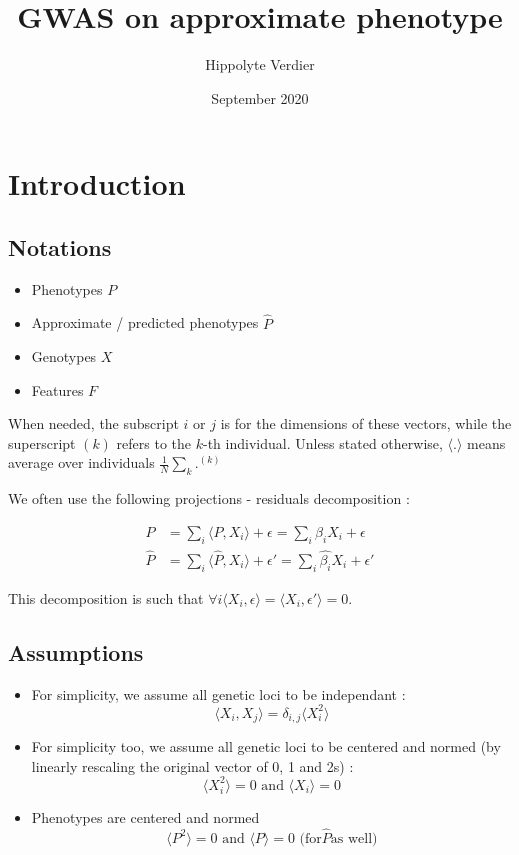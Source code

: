 \documentclass{article}
\title{GWAS on approximate phenotype}
\author{Hippolyte Verdier}
\date{September 2020}
\begin{document}
\maketitle

\section{Introduction}

\subsection{Notations}
\begin{itemize}
\item Phenotypes $P$
\item Approximate / predicted phenotypes $\hat{P}$
\item Genotypes $X$
\item Features $F$
\end{itemize}
When needed, the subscript $i$ or $j$ is for the dimensions of these vectors, while the superscript $(k)$ refers to the $k$-th individual. Unless stated otherwise, $\langle . \rangle$ means average over individuals  $\frac{1}{N} \sum_k . ^{(k)}$

We often use the following projections - residuals decomposition :

\begin{equation}
\begin{split}
P &= \sum_i \langle P, X_i \rangle + \epsilon = \sum_i {\beta_i}X_i + \epsilon \\
\hat{P} &= \sum_i \langle \hat{P}, X_i \rangle + \epsilon' =  \sum_i {\hat{\beta_i}}X_i + \epsilon'
\end{split}
\end{equation}

This decomposition is such that $\forall i \langle X_i,\epsilon \rangle = \langle X_i, \epsilon'\rangle = 0$.

\subsection{Assumptions}

\begin{itemize}
\item For simplicity, we assume all genetic loci to be independant : 
\begin{equation}
\langle X_i, X_j \rangle = \delta_{i,j} \langle X_i^2 \rangle
\end{equation}
\item For simplicity too, we assume all genetic loci to be centered and normed (by linearly rescaling the original vector of 0, 1 and 2s) : 
\begin{equation}
\langle X_i^2 \rangle = 0 \text{ and } \langle X_i \rangle = 0
\end{equation}
\item Phenotypes are centered and normed
\begin{equation}
\langle P^2 \rangle = 0 \text{ and } \langle P \rangle = 0 \text{ (for} \hat{P} \text{as well)}
\end{equation}
\end{itemize}
\end{document}
